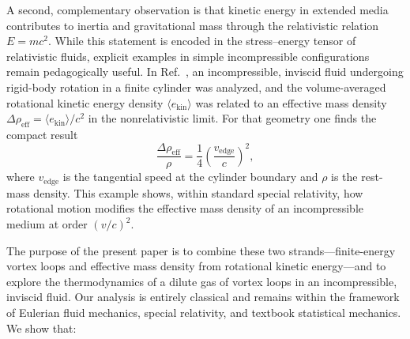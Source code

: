 \documentclass[11pt]{article}
\begin{document}
        A second, complementary observation is that kinetic energy in extended media contributes to
        inertia and gravitational mass through the relativistic relation $E = mc^2$.
        While this statement is encoded in the stress--energy tensor of relativistic fluids,
        explicit examples in simple incompressible configurations remain pedagogically useful.
        In Ref.~\cite{Iskandarani2025_RotKE}, an incompressible, inviscid fluid undergoing rigid-body
        rotation in a finite cylinder was analyzed, and the volume-averaged rotational kinetic energy
        density $\langle e_{\mathrm{kin}}\rangle$ was related to an effective mass density
        $\Delta \rho_{\mathrm{eff}} = \langle e_{\mathrm{kin}}\rangle /c^2$ in the nonrelativistic limit.
        For that geometry one finds the compact result
        \begin{equation}
            \frac{\Delta \rho_{\mathrm{eff}}}{\rho}
            = \frac{1}{4}\left(\frac{v_{\mathrm{edge}}}{c}\right)^2,
        \end{equation}
        where $v_{\mathrm{edge}}$ is the tangential speed at the cylinder boundary and $\rho$ is the
        rest-mass density. This example shows, within standard special relativity, how rotational
        motion modifies the effective mass density of an incompressible medium at order $(v/c)^2$.

        The purpose of the present paper is to combine these two strands---finite-energy vortex loops
        and effective mass density from rotational kinetic energy---and to explore the thermodynamics
        of a dilute gas of vortex loops in an incompressible, inviscid fluid.
        Our analysis is entirely classical and remains within the framework of Eulerian fluid mechanics,
        special relativity, and textbook statistical mechanics. We show that:
\end{document}
